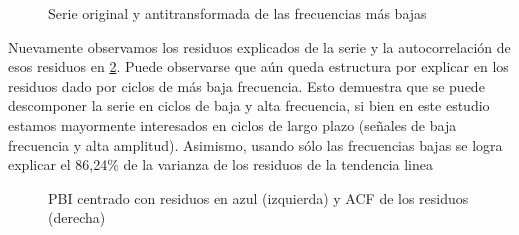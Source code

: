 \documentclass[a4paper]{article}
\begin{document}
\begin{figure}[H]
	\centering
	\caption{Serie original y antitransformada de las frecuencias más bajas} 
	\label{fig:PBI_cntr_antifft}
\end{figure}

Nuevamente observamos los residuos explicados de la serie y la autocorrelación de esos residuos en \ref{fig:PBI_fft_resid}. Puede observarse que aún queda estructura por explicar en los residuos dado por ciclos de más baja frecuencia. Esto demuestra que se puede descomponer la serie en ciclos de baja y alta frecuencia, si bien en este estudio estamos mayormente interesados en ciclos de largo plazo (señales de baja frecuencia y alta amplitud). Asimismo, usando sólo las frecuencias bajas se logra explicar el 86,24\% de la varianza de los residuos de la tendencia linea

\begin{figure}[H]
	\centering
	\caption{PBI centrado con residuos en azul (izquierda) y ACF de los residuos (derecha)}
	\label{fig:PBI_fft_resid}
\end{figure}
\end{document}
